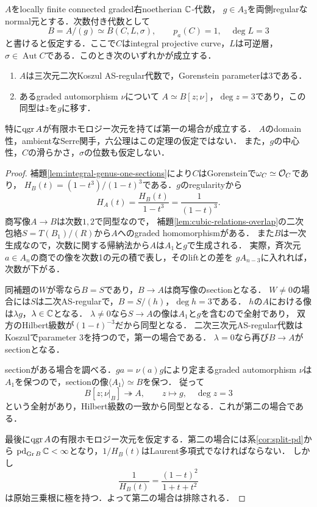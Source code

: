 \documentclass[11pt,a4paper]{ltjsarticle}
\begin{document}
\begin{theorem}[整な三次境界のnormal被覆の二分]
\label{thm:cubic-normal-cover-dichotomy}
$A$をlocally finite connected graded右noetherian $\mathbb C$-代数，
$g\in A_3$を両側regularなnormal元とする．次数付き代数として
\[
 B=A/(g)\simeq B(C,L,\sigma),\qquad p_a(C)=1,\quad\deg L=3
\]
と書けると仮定する．ここで$C$はintegral projective curve，$L$は可逆層，
$\sigma\in\operatorname{Aut}C$である．このとき次のいずれかが成立する．
\begin{enumerate}
\item $A$は三次元二次Koszul AS-regular代数で，Gorenstein parameterは$3$である．
\item あるgraded automorphism $\nu$について
$A\simeq B[z;\nu]$，$\deg z=3$であり，この同型は$z$を$g$に移す．
\end{enumerate}
特に$\operatorname{qgr} A$が有限ホモロジー次元を持てば第一の場合が成立する．
$A$のdomain性，ambientなSerre関手，六公理はこの定理の仮定ではない．
また，$g$の中心性，$C$の滑らかさ，$\sigma$の位数も仮定しない．
\end{theorem}
\begin{proof}
補題\ref{lem:integral-genus-one-sections}により$C$はGorensteinで$\omega_C\simeq\mathcal O_C$であり，
$H_B(t)=(1-t^3)/(1-t)^3$である．$g$のregularityから
\[
 H_A(t)=\frac{H_B(t)}{1-t^3}=\frac1{(1-t)^3}.
\]
商写像$A\to B$は次数$1,2$で同型なので，
補題\ref{lem:cubic-relations-overlap}の二次包絡$S=T(B_1)/(R)$から$A$へのgraded homomorphismがある．
また$B$は一次生成なので，次数に関する帰納法から$A$は$A_1$と$g$で生成される．
実際，斉次元$a\in A_n$の商での像を次数1の元の積で表し，そのliftとの差を
$gA_{n-3}$に入れれば，次数が下がる．

同補題の$W$が零なら$B=S$であり，$B\to A$は商写像のsectionとなる．
$W\ne0$の場合には$S$は二次AS-regularで，$B=S/(h)$，$\deg h=3$である．
$h$の$A$における像は$\lambda g$，$\lambda\in\mathbb C$となる．
$\lambda\ne0$なら$S\to A$の像は$A_1$と$g$を含むので全射であり，
双方のHilbert級数が$(1-t)^{-3}$だから同型となる．
二次三次元AS-regular代数はKoszulでparameter $3$を持つので，第一の場合である．
$\lambda=0$なら再び$B\to A$がsectionとなる．

sectionがある場合を調べる．$ga=\nu(a)g$により定まるgraded automorphism $\nu$は
$A_1$を保つので，sectionの像$\langle A_1\rangle\simeq B$を保つ．
従って
\[
 B[z;\nu|_B]\twoheadrightarrow A,\qquad z\longmapsto g,\quad\deg z=3
\]
という全射があり，Hilbert級数の一致から同型となる．これが第二の場合である．

最後に$\operatorname{qgr} A$の有限ホモロジー次元を仮定する．第二の場合には系\ref{cor:split-pd}から
$\operatorname{pd}_{\operatorname{Gr} B}\mathbb C<\infty$となり，$1/H_B(t)$はLaurent多項式でなければならない．
しかし
\[
 \frac1{H_B(t)}=\frac{(1-t)^2}{1+t+t^2}
\]
は原始三乗根に極を持つ．よって第二の場合は排除される．
\end{proof}
\end{document}
